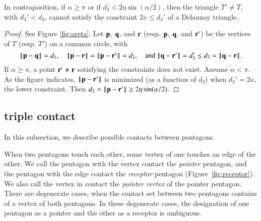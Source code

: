 In contraposition, if $\alpha\ge\pi$ or if $d_2 < 2\eta\sin(\alpha/2)$,
then the triangle $T'\ne T$, with $d_3' < d_3$,
cannot satisfy the constraint $2\kappa\le d_3'$ of a  Delaunay triangle.


\begin{proof} See Figure \ref{fig:areta}.
Let ${\mathbf p}$, ${\mathbf q}$, and ${\mathbf r}$ (resp. ${\mathbf p}$, ${\mathbf q}$, and ${\mathbf r}'$) be the vertices of $T$
(resp. $T'$) on a common  circle, with
\[
\norm{\p}{\q} =d_1, \quad\norm{\p}{\r}=\norm{\p}{\r'}=d_2, \quad\text{and } 
\norm{\q}{\r'} = d_3' \le d_3=\norm{\q}{\r}.
\]
If $\alpha\ge\pi$, a point ${\mathbf r}'\ne {\mathbf r}$ satisfying the constraints does not exist.
Assume $\alpha < \pi$. 
As the figure indicates, $\norm{\p}{\r'}$ is minimized (as a function of $d_2$)
when $d_3' = 2\kappa$, the lower constraint.  Then
$d_2 = \norm{\p}{\r'}\ge 2\eta\sin(\alpha/2)$.
\end{proof}




\subsection{triple contact}

In this subsection, we describe possible contacts between pentagons.

When two pentagons touch each other, some vertex of one touches an
edge of the other.  We call the pentagon with the vertex contact the
{\it pointer} pentagon, and the pentagon with the edge contact the
{\it receptor} pentagon (Figure~\ref{fig:receptor}).  We also call the
vertex in contact the {\it pointer vertex} of the pointer pentagon. There are
degenerate cases, when the contact set between two pentagons contains
of a vertex of both pentagons.  In these degenerate cases, the
designation of one pentagon as a pointer and the other as a receptor
is ambiguous.



